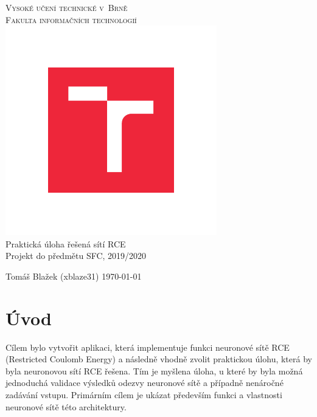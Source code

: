 \documentclass[a4paper, 11pt, titlepage]{article}
\begin{document}
\begin{titlepage}
	\begin{center}
		{\Huge		
			\textsc{Vysoké učení technické v~Brně}}\\
			\medskip
		{\huge
			\textsc{Fakulta informačních technologií}}\\
		\includegraphics{logo.pdf}\\
		{\Huge
			Praktická úloha řešená sítí RCE}\\
		\bigskip
		{\LARGE
			Projekt do předmětu SFC, 2019/2020}\\
		\medskip
	\end{center}
	{\Large Tomáš Blažek (xblaze31) \hfill \today}
\end{titlepage}

\section{Úvod}
Cílem bylo vytvořit aplikaci, která implementuje funkci neuronové sítě RCE (Restricted Coulomb Energy) a následně vhodně zvolit praktickou úlohu, která by byla neuronovou sítí RCE řešena. Tím je myšlena úloha, u které by byla možná jednoduchá validace výsledků odezvy neuronové sítě a případně nenáročné zadávání vstupu. Primárním cílem je ukázat především funkci a vlastnosti neuronové sítě této architektury.
\end{document}
